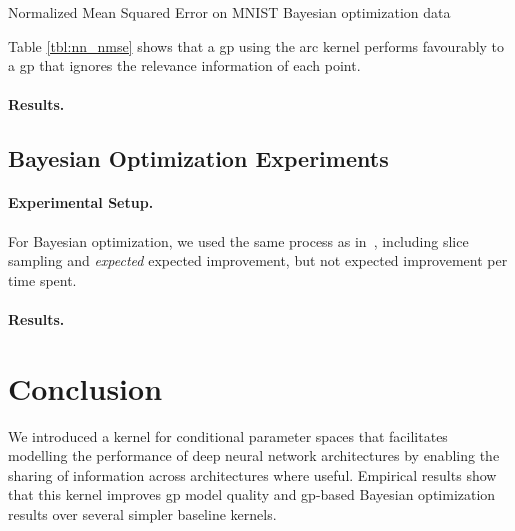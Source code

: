\documentclass{article}
\newcommand{\note}[1]{}
\newcommand{\gp}{{\sc gp}}
\begin{document}
\begin{table}[h!]
\caption{{\small Normalized Mean Squared Error on MNIST Bayesian optimization data\label{tab:nn_error}}}
\label{tbl:nn_nmse}

\end{table}
Table \ref{tbl:nn_nmse} shows that a \gp{} using the arc kernel performs favourably to a \gp{} that ignores the relevance information of each point.

\paragraph{Results.}

\subsection{Bayesian Optimization Experiments}  
\vspace{-0.05in} 

\note{KS: Will add plots in the morning and finish this section.} 

\paragraph{Experimental Setup.}
For Bayesian optimization, we used the same process as in~\cite{snoek-etal-2012b}, including slice sampling and \emph{expected} expected improvement, but not expected improvement per time spent.
\note{FH: mention anything that differed in the setup.}

\paragraph{Results.}
\note{FH: Discuss results including the nice figure of error over time. Also briefly mention experiments on datasets that did \emph{not} look awesome (we can't pick and choose!)}


\section{Conclusion}
\vspace{-0.05in} 

We introduced a kernel for conditional parameter spaces that facilitates modelling the performance of deep neural network architectures by enabling the sharing of information across architectures where useful.
Empirical results show that this kernel improves \gp{} model quality and \gp{}-based Bayesian optimization results over several simpler baseline kernels.
\note{FH: fleshed out very briefly - please feel free to expand, e.g., to add a highlight from the experiments.}




\end{document}
